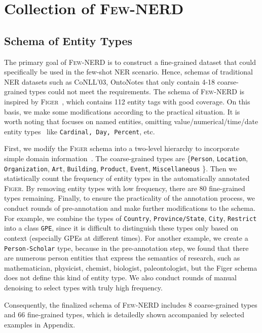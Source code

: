 \documentclass[11pt,a4paper, dvipsnames]{article}
\begin{document}
\section{Collection of \textsc{Few-NERD}}


\subsection{Schema of Entity Types}
\label{sec:schema}

The primary goal of \textsc{Few-NERD} is to construct a fine-grained dataset that could specifically be used in the few-shot NER scenario. 
Hence, schemas of traditional NER datasets such as CoNLL'03, OntoNotes that only contain 4-18 coarse-grained types could not meet the requirements. 
The schema of \textsc{Few-NERD} is inspired by \textsc{Figer}~\cite{ling2012fine}, which contains 112 entity tags with good coverage. On this basis, we make some modifications according to the practical situation. It is worth noting that  focuses on named entities, omitting value/numerical/time/date entity types~\cite{weischedel2013ontonotes, ringland2019nne} like \texttt{Cardinal, Day, Percent}, etc.

First, we modify the \textsc{Figer} schema into a two-level hierarchy to incorporate simple domain information~\cite{gillick2014context}. The coarse-grained types are \{\texttt{Person}, \texttt{Location}, \texttt{Organization}, \texttt{Art}, \texttt{Building}, \texttt{Product}, \texttt{Event}, \texttt{Miscellaneous} \}.
Then we statistically count the frequency of entity types in the automatically annotated \textsc{Figer}. By removing entity types with low frequency, there are 80 fine-grained types remaining. Finally, to ensure the practicality of the annotation process, we conduct rounds of pre-annotation and make further modifications to the schema. For example, we combine the types of \texttt{Country}, \texttt{Province/State}, \texttt{City}, \texttt{Restrict} into a class \texttt{GPE}, since it is difficult to distinguish these types only based on context (especially GPEs at different times). For another example, we create a \texttt{Person-Scholar} type, because in the pre-annotation step, we found that there are numerous person entities that express the semantics of research, such as mathematician, physicist, chemist, biologist, paleontologist, but the Figer schema does not define this kind of entity type. We also conduct rounds of manual denoising to select types with truly high frequency.

Consequently, the finalized schema of \textsc{Few-NERD} includes 8 coarse-grained types and 66 fine-grained types, which is detailedly shown accompanied by selected examples in Appendix.
\end{document}
